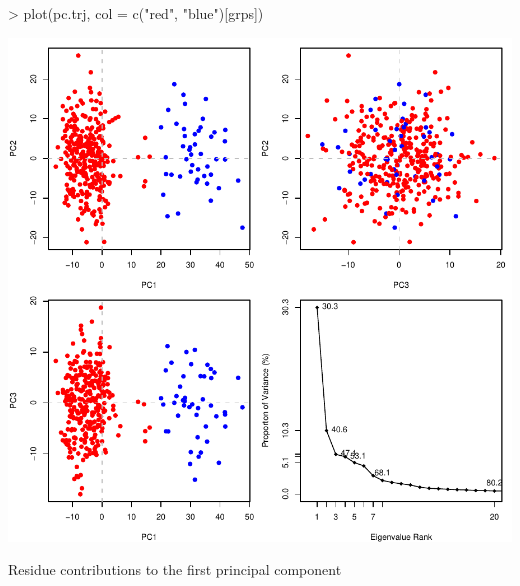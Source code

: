 \documentclass[a4paper]{article}
\begin{document}
\begin{center}
\begin{Schunk}
\begin{Sinput}
> plot(pc.trj, col = c("red", "blue")[grps])
\end{Sinput}
\end{Schunk}
\includegraphics{figs/fig-044}
\end{center}


Residue contributions to the first principal component
\end{document}
